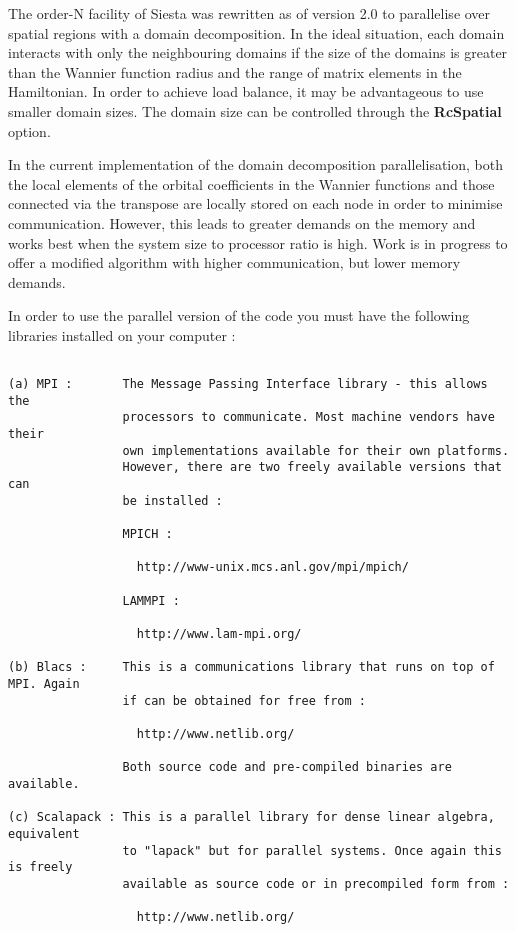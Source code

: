 \documentclass[11pt]{article}
\begin{document}
The order-N facility of {\sc Siesta} was rewritten as of version 2.0
to parallelise over spatial regions with a domain decomposition. In the
ideal situation, each domain interacts with only the neighbouring domains
if the size of the domains is greater than the Wannier function radius and
the range of matrix elements in the Hamiltonian. In order to achieve load
balance, it may be advantageous to use smaller domain sizes. The domain
size can be controlled through the {\bf RcSpatial} option.

In the current implementation of the domain decomposition parallelisation,
both the local elements of the orbital coefficients in the Wannier functions
and those connected via the transpose are locally stored on each node in order
to minimise communication. However, this leads to greater demands on the memory
and works best when the system size to processor ratio is high. Work is in
progress to offer a modified algorithm with higher communication, but lower
memory demands.

In order to use the parallel version of the code you must have the following
libraries installed on your computer :

\begin{verbatim}

(a) MPI :       The Message Passing Interface library - this allows the
                processors to communicate. Most machine vendors have their
                own implementations available for their own platforms.
                However, there are two freely available versions that can
                be installed :

                MPICH :

                  http://www-unix.mcs.anl.gov/mpi/mpich/

                LAMMPI :

                  http://www.lam-mpi.org/

(b) Blacs :     This is a communications library that runs on top of MPI. Again
                if can be obtained for free from :

                  http://www.netlib.org/

                Both source code and pre-compiled binaries are available.

(c) Scalapack : This is a parallel library for dense linear algebra, equivalent
                to "lapack" but for parallel systems. Once again this is freely
                available as source code or in precompiled form from :

                  http://www.netlib.org/

\end{verbatim}
\end{document}
